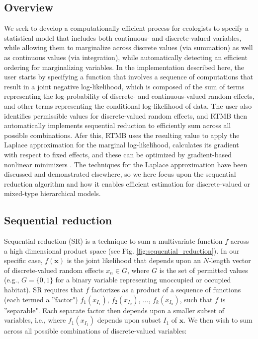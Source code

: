 \documentclass[11pt]{article}
\newcommand{\vect}[1]{\bm{#1}}
\begin{document}
\subsection{Overview}
We seek to develop a computationally efficient process for ecologists to specify a statistical model that includes both continuous- and discrete-valued variables, while allowing them to marginalize across discrete values (via summation) as well as continuous values (via integration), while automatically detecting an efficient ordering for marginalizing variables.  In the implementation described here, the user starts by specifying a function that involves a sequence of computations that result in a joint negative log-likelihood, which is composed of the sum of terms representing the log-probability of discrete- and continuous-valued random effects, and other terms representing the conditional log-likelihood of data.  The user also identifies permissible values for discrete-valued random effects, and RTMB then automatically implements sequential reduction to efficiently sum across all possible combinations.  Afer this, RTMB uses the resulting value to apply the Laplace approximation for the marginal log-likelihood, calculates its gradient with respect to fixed effects, and these can be optimized by gradient-based nonlinear minimizers \citep{kristensen_tmb:_2014,kristensen_rtmb_2024}.  The techniques for the Laplace approximation have been discussed and demonstrated elsewhere, so we here focus upon the sequential reduction algorithm and how it enables efficient estimation for discrete-valued or mixed-type hierarchical models. 

\subsection{Sequential reduction}

Sequential reduction (SR) is a technique to sum a multivariate function $f$ across a high dimensional product space (see Fig. \ref{fig:sequential_reduction}).  In our specific case, $f(\vect{x})$ is the joint likelihood that depends upon an $N$-length vector of discrete-valued random effects $x_n \in G$, where $G$ is the set of permitted values (e.g., $G = \{0,1\}$ for a binary variable representing unoccupied or occupied habitat).  SR requires that $f$ factorizes as a product of a sequence of functions (each termed a ''factor") $f_1(x_{I_1})$, $f_2(x_{I_2})$, ..., $f_k(x_{I_k})$, such that $f$ is ''separable".  Each separate factor then depends upon a smaller subset of variables, i.e., where $f_1(x_{I_1})$ depends upon subset $I_1$ of $\vect{x}$.  We then wish to sum across all possible combinations of discrete-valued variables:
\end{document}
